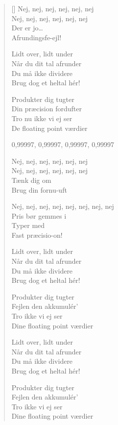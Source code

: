 \begin{multicols}
\begin{verse}[\versewidth]
        Nej, nej, nej, nej, nej, nej\\
        Nej, nej, nej, nej, nej, nej\\
        Der er jo\ldots\\
        Afrundingsfe-ejl!
    

        Lidt over, lidt under\\
        Når du dit tal afrunder\\
        Du må ikke dividere\\
        Brug dog et heltal hér!

        Produkter dig tugter\\
        Din præcision fordufter\\
        Tro nu ikke vi ej ser\\
        De floating point værdier
    
    
        0,99997, 0,99997, 0,99997, 0,99997 
    

        Nej, nej, nej, nej, nej, nej\\
        Nej, nej, nej, nej, nej, nej\\
        Tænk dig om\\
        Brug din fornu-uft

        Nej, nej, nej, nej, nej, nej, nej, nej\\
        Pris bør gemmes i\\
        Typer med\\
        Fast præcisio-on!
    

        Lidt over, lidt under\\
        Når du dit tal afrunder\\
        Du må ikke dividere\\
        Brug dog et heltal hér!

        Produkter dig tugter\\
        Fejlen den akkumulér'\\
        Tro ikke vi ej ser\\
        Dine floating point værdier
    

        Lidt over, lidt under\\
        Når du dit tal afrunder\\
        Du må ikke dividere\\
        Brug dog et heltal hér!

        Produkter dig tugter\\
        Fejlen den akkumulér'\\
        Tro ikke vi ej ser\\
        Dine floating point værdier
\end{verse}
\end{multicols}
\newpage

